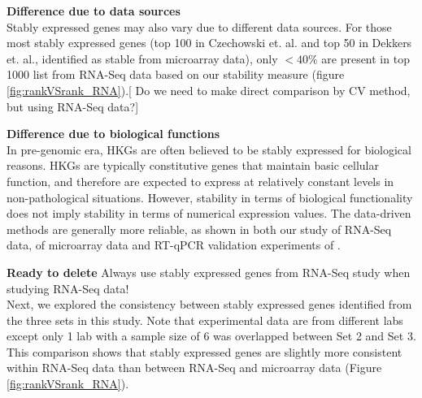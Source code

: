 \documentclass[11pt, a4paper]{article}
\begin{document}


\textbf{Difference due to data sources}\\
Stably expressed genes may also vary due to different data sources. For those most stably expressed genes (top 100 in Czechowski et. al. and top 50 in  Dekkers et. al., identified as stable from microarray data), only $< 40\%$ are present in top 1000 list from RNA-Seq data based on our stability measure (figure \ref{fig:rankVSrank_RNA}).[ Do we need to make direct comparison by CV method, but using RNA-Seq data?]

\textbf{Difference due to biological functions}\\
 In pre-genomic era, HKGs are often believed to be stably expressed for biological reasons. HKGs are typically constitutive genes that maintain basic cellular function, and therefore are expected to express at relatively constant levels in non-pathological situations. However, stability in terms of biological functionality does not imply stability in terms of numerical expression values. The data-driven methods are generally more reliable, as shown in both our study of RNA-Seq data, \cite{czechowski2005genome} of microarray data and RT-qPCR validation experiments of \citep{hruz2011refgenes}.


\textbf{Ready to delete}
Always use stably expressed genes from RNA-Seq study when studying RNA-Seq data! \\ 
Next, we explored the consistency between stably expressed genes identified from the three sets in this study. Note that experimental data are from different labs except only 1 lab with a sample size of 6 was overlapped between Set 2 and Set 3. This comparison shows that stably expressed genes are slightly more consistent within RNA-Seq data than between RNA-Seq and microarray data (Figure \ref{fig:rankVSrank_RNA}).
\end{document}
